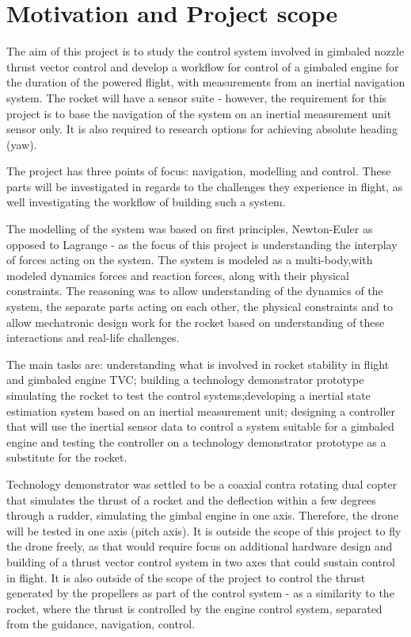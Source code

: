 \section{Motivation and Project scope}

The aim of this project is to study the control system involved in gimbaled nozzle thrust vector control and develop a workflow for control of a gimbaled engine for the duration of the powered flight, with measurements from an inertial navigation system. The rocket will have a sensor suite - however, the requirement for this project is to base the navigation of the system on an inertial measurement unit sensor only. It is also required to research options for achieving absolute heading (yaw). 

The project has three points of focus: navigation, modelling and control. These parts will be investigated in regards to the challenges they experience in flight, as well investigating the workflow of building such a system.

The modelling of the system was based on first principles, Newton-Euler as opposed to Lagrange - as the focus of this project is understanding the interplay of forces acting on the system. The system is modeled as a multi-body,with modeled  dynamics forces and reaction forces, along with their physical constraints. The reasoning was to allow understanding of the dynamics of the system, the separate parts acting on each other, the physical constraints and to allow mechatronic design work for the rocket based on understanding of these interactions and real-life challenges. 

The main tasks are: understanding what is involved in rocket stability in flight and gimbaled engine TVC; building a technology demonstrator prototype simulating the rocket to test the control systems;developing a inertial state estimation system based on an inertial measurement unit; designing a controller that will use the inertial sensor data to control a system suitable for a gimbaled engine and testing the controller on a technology demonstrator prototype as a substitute for the rocket. 

Technology demonstrator was settled to be a coaxial contra rotating dual copter that simulates the thrust of a rocket and the deflection within a few degrees through a rudder, simulating the gimbal engine in one axis. Therefore, the drone will be tested in one axis (pitch axis). It is outside the scope of this project to fly the drone freely, as that would require focus on additional hardware design and building of a thrust vector control system in two axes that could sustain control in flight. It is also outside of the scope of the project to control the thrust generated by the propellers as part of the control system - as a similarity to the rocket, where the thrust is controlled by the engine control system, separated from the guidance, navigation, control. 


